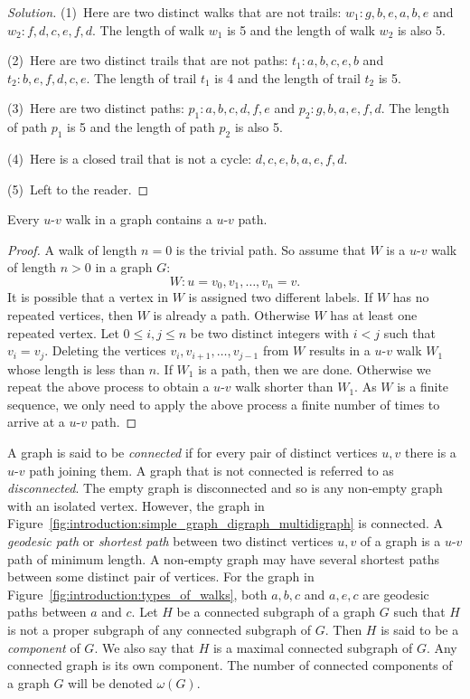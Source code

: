 \begin{proof}[Solution]
(1)~Here are two distinct walks that are not trails:
$w_1: g, b, e, a, b, e$ and $w_2: f, d, c, e, f, d$. The length of
walk $w_1$ is 5 and the length of walk $w_2$ is also 5.

(2)~Here are two distinct trails that are not paths:
$t_1: a,b,c,e,b$ and $t_2: b,e,f,d,c,e$. The length of trail $t_1$ is
4 and the length of trail $t_2$ is 5.

(3)~Here are two distinct paths: $p_1: a, b, c, d, f, e$ and
$p_2: g, b, a, e, f, d$. The length of path $p_1$ is 5 and the length
of path $p_2$ is also 5.

(4)~Here is a closed trail that is not a cycle: $d, c, e, b, a, e, f, d$.

(5)~Left to the reader.
\end{proof}

\begin{theorem}
\label{thm:introduction:every_walk_has_a_path}
Every $u$-$v$ walk in a graph contains a $u$-$v$ path.
\end{theorem}

\begin{proof}
A walk of length $n = 0$ is the trivial path. So assume that $W$ is a
$u$-$v$ walk of length $n > 0$ in a graph $G$:
\[
W: u = v_0, v_1, \dots, v_n = v.
\]
It is possible that a vertex in $W$ is assigned two different
labels. If $W$ has no repeated vertices, then $W$ is already a
path. Otherwise $W$ has at least one repeated vertex. Let
$0 \leq i,j \leq n$ be two distinct integers with $i < j$ such that
$v_i = v_j$. Deleting the vertices $v_i, v_{i+1}, \dots, v_{j-1}$ from
$W$ results in a $u$-$v$ walk $W_1$ whose length is less than $n$. If
$W_1$ is a path, then we are done. Otherwise we repeat the above
process to obtain a $u$-$v$ walk shorter than $W_1$. As $W$ is a
finite sequence, we only need to apply the above process a finite
number of times to arrive at a $u$-$v$ path.
\end{proof}

A graph is said to be
\emph{connected} if for
every pair of distinct vertices $u, v$ there is a $u$-$v$ path joining
them. A graph that is not connected is referred to as
\emph{disconnected}.
The empty graph is disconnected and so is any non-empty graph with an
isolated vertex. However, the graph in
Figure~\ref{fig:introduction:simple_graph_digraph_multidigraph} is
connected. A \emph{geodesic path} or
\emph{shortest path} between two distinct
vertices $u,v$ of a graph is a $u$-$v$ path of minimum length. A
non-empty graph may have several shortest paths between some distinct
pair of vertices. For the graph in
Figure~\ref{fig:introduction:types_of_walks}, both $a,b,c$ and $a,e,c$
are geodesic paths between $a$ and $c$. Let $H$ be a connected
subgraph of a graph $G$ such that $H$ is not a proper subgraph of any
connected subgraph of $G$. Then $H$ is said to be a
\emph{component} of $G$. We also say that $H$ is a
maximal connected subgraph of $G$. Any connected graph is its own
component. The number of connected components of a graph $G$ will be
denoted $\omega(G)$\index{$\omega$}.

